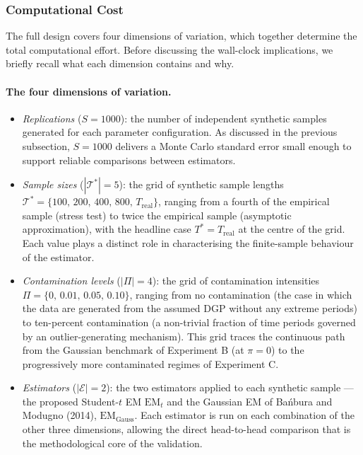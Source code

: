\documentclass[11pt, a4paper, oneside]{article}
\begin{document}
\subsubsection{Computational Cost}

The full design covers four dimensions of variation, which together
determine the total computational effort. Before discussing the
wall-clock implications, we briefly recall what each dimension
contains and why.

\paragraph{The four dimensions of variation.}
\begin{itemize}[leftmargin=1.5em, itemsep=4pt]
    \item \emph{Replications} ($S = 1000$): the number of independent
          synthetic samples generated for each parameter
          configuration. As discussed in the previous subsection,
          $S = 1000$ delivers a Monte Carlo standard error small
          enough to support reliable comparisons between estimators.
    \item \emph{Sample sizes} ($|\mathcal{T}^*| = 5$): the grid of
          synthetic sample lengths
          $\mathcal{T}^* = \{100,\, 200,\, 400,\, 800,\, T_{\mathrm{real}}\}$,
          ranging from a fourth of the empirical sample (stress
          test) to twice the empirical sample (asymptotic
          approximation), with the headline case
          $T^* = T_{\mathrm{real}}$ at the centre of the grid. Each
          value plays a distinct role in characterising the
          finite-sample behaviour of the estimator.
    \item \emph{Contamination levels} ($|\Pi| = 4$): the grid of
          contamination intensities
          $\Pi = \{0,\, 0.01,\, 0.05,\, 0.10\}$, ranging from no
          contamination (the case in which the data are generated
          from the assumed DGP without any extreme periods) to
          ten-percent contamination (a non-trivial fraction of
          time periods governed by an outlier-generating mechanism).
          This grid traces the continuous path from the Gaussian
          benchmark of Experiment B (at $\pi = 0$) to the
          progressively more contaminated regimes of Experiment C.
    \item \emph{Estimators} ($|\mathcal{E}| = 2$): the two
          estimators applied to each synthetic sample — the
          proposed Student-$t$ EM
          $\mathrm{EM}_t$ and the Gaussian EM of
          Bańbura and Modugno (2014),
          $\mathrm{EM}_{\mathrm{Gauss}}$. Each estimator is run on
          each combination of the other three dimensions, allowing
          the direct head-to-head comparison that is the
          methodological core of the validation.
\end{itemize}
\end{document}
